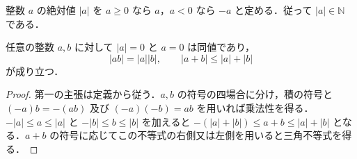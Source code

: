 \begin{defn}[整数の絶対値]
整数 $a$ の絶対値 $|a|$ を $a\geq0$ なら $a$，$a<0$ なら $-a$ と定める．従って $|a|\in\mathbb N$ である．
\end{defn}
\begin{prop}[整数の絶対値の性質]
任意の整数 $a,b$ に対して $|a|=0$ と $a=0$ は同値であり，
\[
 |ab|=|a||b|,\qquad |a+b|\leq|a|+|b|
\]
が成り立つ．
\end{prop}
\begin{proof}
第一の主張は定義から従う．$a,b$ の符号の四場合に分け，積の符号と $(-a)b=-(ab)$ 及び $(-a)(-b)=ab$ を用いれば乗法性を得る．$-|a|\leq a\leq|a|$ と $-|b|\leq b\leq|b|$ を加えると $-(|a|+|b|)\leq a+b\leq|a|+|b|$ となる．$a+b$ の符号に応じてこの不等式の右側又は左側を用いると三角不等式を得る．
\end{proof}
